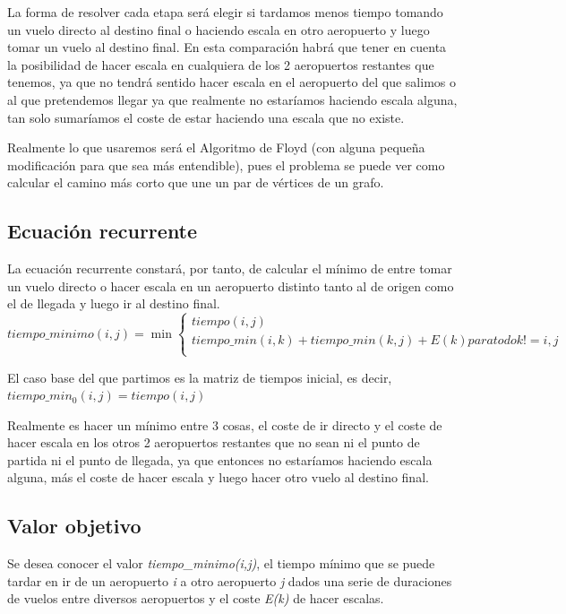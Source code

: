 La forma de resolver cada etapa será elegir si tardamos menos tiempo tomando un vuelo directo al destino final o haciendo escala en otro aeropuerto y luego tomar un vuelo al destino final. En esta comparación habrá que tener en cuenta la posibilidad de hacer escala en cualquiera de los 2 aeropuertos restantes que tenemos, ya que no tendrá sentido hacer escala en el aeropuerto del que salimos o al que pretendemos llegar ya que realmente no estaríamos haciendo escala alguna, tan solo sumaríamos el coste de estar haciendo una escala que no existe. 

Realmente lo que usaremos será el Algoritmo de Floyd (con alguna pequeña modificación para que sea más entendible), pues el problema se puede ver como calcular el camino más corto que une un par de vértices de un grafo.

\subsection{Ecuación recurrente}

La ecuación recurrente constará, por tanto, de calcular el mínimo de entre tomar un vuelo directo o hacer escala en un aeropuerto distinto tanto al de origen como el de llegada y luego ir al destino final.
\[
tiempo\_minimo(i, j) =  \min \begin{cases} 
tiempo (i, j) \\
tiempo\_min(i, k) + tiempo\_min(k, j) + E(k) para todo k!=i,j\\
\end{cases}
\]

El caso base del que partimos es la matriz de tiempos inicial, es decir, \(tiempo\_min_{0}(i,j) = tiempo(i,j)\)

Realmente es hacer un mínimo entre 3 cosas, el coste de ir directo y el coste de hacer escala en los otros 2 aeropuertos restantes que no sean ni el punto de partida ni el punto de llegada, ya que entonces no estaríamos haciendo escala alguna, más el coste de hacer escala y luego hacer otro vuelo al destino final.

\subsection{Valor objetivo}

Se desea conocer el valor \textit{tiempo\_minimo(i,j)}, el tiempo mínimo que se puede tardar en ir de un aeropuerto \textit{i} a otro aeropuerto \textit{j} dados una serie de duraciones de vuelos entre diversos aeropuertos y el coste \textit{E(k)} de hacer escalas.

